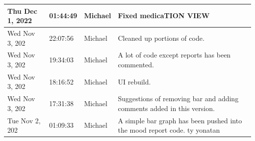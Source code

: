 \documentclass[11pt]{article}
\begin{document}
\begin{center}
\begin{longtable}{|p{2.7cm}|l|p{2cm}|p{8cm}|}
           \hline Thu Dec 1, 2022                            & 01:44:49                           & Michael                                 & Fixed medicaTION VIEW                                                                                                                                                                                                                                                                                      \\
           \hline Wed Nov 3,  202                              & 22:07:56                           & Michael                                 & Cleaned up portions of code.                                                                                                                                                                                                                                                                               \\
           \hline Wed Nov 3,  202                              & 19:34:03                           & Michael                                 & A lot of code except reports has been commented.                                                                                                                                                                                                                                                           \\
           \hline Wed Nov 3,  202                              & 18:16:52                           & Michael                                 & UI rebuild.                                                                                                                                                                                                                                                                                                \\
           \hline Wed Nov 3,  202                              & 17:31:38                           & Michael                                 & Suggestions of removing bar and adding comments added in this version.                                                                                                                                                                                                                                     \\
           \hline Tue Nov 2,  202                              & 01:09:33                           & Michael                                 & A simple bar graph has been pushed into the mood report code. ty yonatan                                                                                                                                                                                                                                   \\

\end{longtable}
\end{center}
\end{document}
